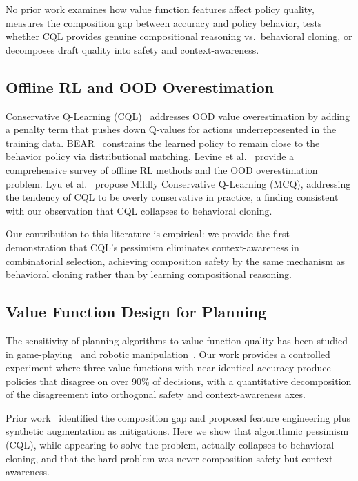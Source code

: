 \documentclass[journal]{IEEEtran}
\begin{document}
No prior work examines how value function features affect policy quality, measures the composition gap between accuracy and policy behavior, tests whether CQL provides genuine compositional reasoning vs.\ behavioral cloning, or decomposes draft quality into safety and context-awareness.

\subsection{Offline RL and OOD Overestimation}

Conservative Q-Learning (CQL)~\cite{kumar2020conservative} addresses OOD value overestimation by adding a penalty term that pushes down Q-values for actions underrepresented in the training data. BEAR~\cite{kumar2019stabilizing} constrains the learned policy to remain close to the behavior policy via distributional matching. Levine et al.~\cite{levine2020offline} provide a comprehensive survey of offline RL methods and the OOD overestimation problem. Lyu et al.~\cite{lyu2022mildly} propose Mildly Conservative Q-Learning (MCQ), addressing the tendency of CQL to be overly conservative in practice, a finding consistent with our observation that CQL collapses to behavioral cloning.

Our contribution to this literature is empirical: we provide the first demonstration that CQL's pessimism eliminates context-awareness in combinatorial selection, achieving composition safety by the same mechanism as behavioral cloning rather than by learning compositional reasoning.

\subsection{Value Function Design for Planning}

The sensitivity of planning algorithms to value function quality has been studied in game-playing~\cite{silver2016mastering} and robotic manipulation~\cite{kalashnikov2018qtopt}. Our work provides a controlled experiment where three value functions with near-identical accuracy produce policies that disagree on over 90\% of decisions, with a quantitative decomposition of the disagreement into orthogonal safety and context-awareness axes.

Prior work~\cite{segan2026composition} identified the composition gap and proposed feature engineering plus synthetic augmentation as mitigations. Here we show that algorithmic pessimism (CQL), while appearing to solve the problem, actually collapses to behavioral cloning, and that the hard problem was never composition safety but context-awareness.
\end{document}
